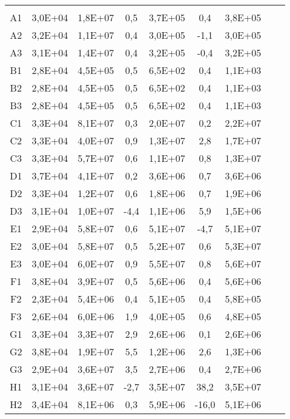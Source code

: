 \begin{center}
\begin{longtable}{ccccccccc}
\toprule
\endhead
\midrule \\ %
\endfoot
\bottomrule 
\endlastfoot
A1    & 3,0E+04 & 1,8E+07 & 0,5   & 3,7E+05 & 0,4   & 3,8E+05 \\
A2    & 3,2E+04 & 1,1E+07 & 0,4   & 3,0E+05 & -1,1  & 3,0E+05 \\
A3    & 3,1E+04 & 1,4E+07 & 0,4   & 3,2E+05 & -0,4  & 3,2E+05 \\
B1    & 2,8E+04 & 4,5E+05 & 0,5   & 6,5E+02 & 0,4   & 1,1E+03 \\
B2    & 2,8E+04 & 4,5E+05 & 0,5   & 6,5E+02 & 0,4   & 1,1E+03 \\
B3    & 2,8E+04 & 4,5E+05 & 0,5   & 6,5E+02 & 0,4   & 1,1E+03 \\
C1    & 3,3E+04 & 8,1E+07 & 0,3   & 2,0E+07 & 0,2   & 2,2E+07 \\
C2    & 3,3E+04 & 4,0E+07 & 0,9   & 1,3E+07 & 2,8   & 1,7E+07 \\
C3    & 3,3E+04 & 5,7E+07 & 0,6   & 1,1E+07 & 0,8   & 1,3E+07 \\
D1    & 3,7E+04 & 4,1E+07 & 0,2   & 3,6E+06 & 0,7   & 3,6E+06 \\
D2    & 3,3E+04 & 1,2E+07 & 0,6   & 1,8E+06 & 0,7   & 1,9E+06 \\
D3    & 3,1E+04 & 1,0E+07 & -4,4  & 1,1E+06 & 5,9   & 1,5E+06 \\
E1    & 2,9E+04 & 5,8E+07 & 0,6   & 5,1E+07 & -4,7  & 5,1E+07 \\
E2    & 3,0E+04 & 5,8E+07 & 0,5   & 5,2E+07 & 0,6   & 5,3E+07 \\
E3    & 3,0E+04 & 6,0E+07 & 0,9   & 5,5E+07 & 0,8   & 5,6E+07 \\
F1    & 3,8E+04 & 3,9E+07 & 0,5   & 5,6E+06 & 0,4   & 5,6E+06 \\
F2    & 2,3E+04 & 5,4E+06 & 0,4   & 5,1E+05 & 0,4   & 5,8E+05 \\
F3    & 2,6E+04 & 6,0E+06 & 1,9   & 4,0E+05 & 0,6   & 4,8E+05 \\
G1    & 3,3E+04 & 3,3E+07 & 2,9   & 2,6E+06 & 0,1   & 2,6E+06 \\
G2    & 3,8E+04 & 1,9E+07 & 5,5   & 1,2E+06 & 2,6   & 1,3E+06 \\
G3    & 2,9E+04 & 3,6E+07 & 3,5   & 2,7E+06 & 0,4   & 2,7E+06 \\
H1    & 3,1E+04 & 3,6E+07 & -2,7  & 3,5E+07 & 38,2  & 3,5E+07 \\
H2    & 3,4E+04 & 8,1E+06 & 0,3   & 5,9E+06 & -16,0 & 5,1E+06 \\

\end{longtable}
\end{center}
